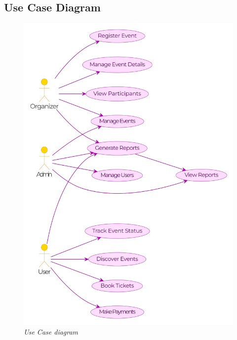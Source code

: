 \documentclass[twoside,a4paper,openright]{report} %
\begin{document}
\subsection{Use Case Diagram}
\begin{figure}[H]
	\centering
	\includegraphics[scale=0.50]{use.jpg}   
	\caption{\textit{Use Case diagram}}
	\label{fig:use-case-diagram}
\end{figure}
\end{document}
